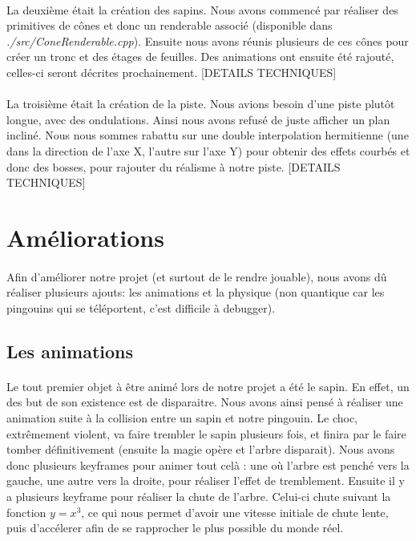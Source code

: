 \documentclass[11pt]{article}
\begin{document}
    \paragraph{}
    La deuxième était la création des sapins.
    Nous avons commencé par réaliser des primitives de cônes et donc un renderable associé (disponible dans \textit{./src/ConeRenderable.cpp}).
    Ensuite nous avons réunis plusieurs de ces cônes pour créer un tronc et des étages de feuilles.
    Des animations ont ensuite été rajouté, celles-ci seront décrites prochainement.
    [DETAILS TECHNIQUES]

    \paragraph{}
    La troisième était la création de la piste.
    Nous avions besoin d'une piste plutôt longue, avec des ondulations. Ainsi nous avons refusé de juste afficher un plan incliné.
    Nous nous sommes rabattu sur une double interpolation hermitienne (une dans la direction de l'axe X, l'autre sur l'axe Y) pour obtenir des effets courbés et donc des bosses, pour rajouter du réalisme à notre piste.
    [DETAILS TECHNIQUES]

    \newpage
    \section{Améliorations}

    \paragraph{}
    Afin d'améliorer notre projet (et surtout de le rendre jouable), nous avons dû réaliser plusieurs ajouts: les animations et la physique (non quantique car les pingouins qui se téléportent, c'est difficile à debugger).

    \subsection{Les animations}

    \paragraph{}
    Le tout premier objet à être animé lors de notre projet a été le sapin. En effet, un des but de son existence est de disparaitre.
    Nous avons ainsi pensé à réaliser une animation suite à la collision entre un sapin et notre pingouin.
    Le choc, extrêmement violent, va faire trembler le sapin plusieurs fois, et finira par le faire tomber définitivement (ensuite la magie opère et l'arbre disparait).
    Nous avons donc plusieurs keyframes pour animer tout celà : une où l'arbre est penché vers la gauche, une autre vers la droite, pour réaliser l'effet de tremblement.
    Ensuite il y a plusieurs keyframe pour réaliser la chute de l'arbre.
    Celui-ci chute suivant la fonction $y=x^3$, ce qui nous permet d'avoir une vitesse initiale de chute lente, puis d'accélerer afin de se rapprocher le plus possible du monde réel.
\end{document}
